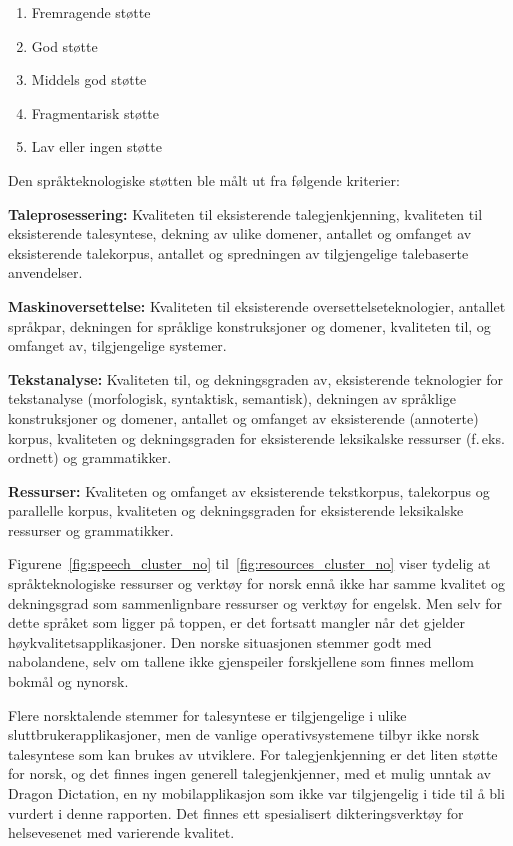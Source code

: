 \begin{multicols}{2}
\begin{enumerate}
\item Fremragende støtte
\item God støtte
\item Middels god støtte 
\item Fragmentarisk støtte
\item Lav eller ingen støtte
\end{enumerate}

Den språkteknologiske støtten ble målt ut fra følgende kriterier:

\textbf{Taleprosessering:} Kvaliteten til eksisterende talegjenkjenning, kvaliteten til eksisterende talesyntese, dekning av ulike domener, antallet og omfanget av eksisterende talekorpus, antallet og spredningen av tilgjengelige talebaserte anvendelser.

\textbf{Maskinoversettelse:} Kvaliteten til eksisterende oversettelseteknologier, antallet språkpar, dekningen for språklige konstruksjoner og domener, kvaliteten til, og omfanget av, tilgjengelige systemer.

\textbf{Tekstanalyse:} Kvaliteten til, og dekningsgraden av, eksisterende teknologier for tekstanalyse (morfologisk, syntaktisk, semantisk), dekningen av språklige konstruksjoner og domener, antallet og omfanget av eksisterende (annoterte) korpus, kvaliteten og dekningsgraden for eksisterende leksikalske ressurser (f.\,eks. ordnett) og grammatikker.

\textbf{Ressurser:} Kvaliteten og omfanget av eksisterende tekstkorpus, talekorpus og parallelle korpus, kvaliteten og dekningsgraden for eksisterende leksikalske ressurser og grammatikker.

Figurene~\ref{fig:speech_cluster_no} til~\ref{fig:resources_cluster_no} viser tydelig at språkteknologiske ressurser og verktøy for norsk ennå ikke har samme kvalitet og dekningsgrad som sammenlignbare ressurser og verktøy for engelsk. Men selv for dette språket som ligger på toppen, er det fortsatt mangler når det gjelder høykvalitetsapplikasjoner. 
Den norske situasjonen stemmer godt med nabolandene, selv om tallene ikke gjenspeiler forskjellene som finnes mellom bokmål og nynorsk.

Flere norsktalende stemmer for talesyntese er tilgjengelige i ulike sluttbrukerapplikasjoner, men de vanlige operativsystemene tilbyr ikke norsk talesyntese som kan brukes av utviklere. 
For talegjenkjenning er det liten støtte for norsk, og det finnes ingen generell talegjenkjenner, med et mulig unntak av Dragon Dictation, en ny mobilapplikasjon som ikke var tilgjengelig i tide til å bli vurdert i denne rapporten.
Det finnes ett spesialisert dikteringsverktøy for helsevesenet med varierende kvalitet.


\end{multicols}
